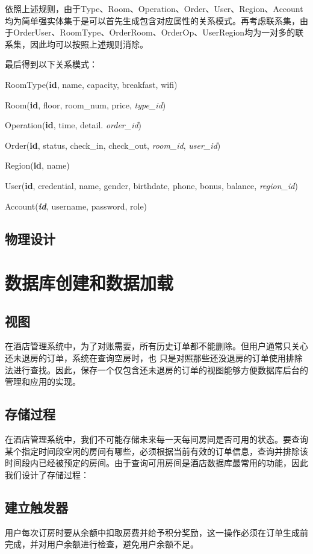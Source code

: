 \documentclass{myreport}
\begin{document}
依照上述规则，由于Type、Room、Operation、Order、User、Region、Account均为简单强实体集于是可以首先生成包含对应属性的关系模式。再考虑联系集，由于OrderUser、RoomType、OrderRoom、OrderOp、UserRegion均为一对多的联系集，因此均可以按照上述规则消除。

最后得到以下关系模式：

RoomType(\textbf{id}, name, capacity, breakfast, wifi)

Room(\textbf{id}, floor, room\_num, price, \textit{type\_id})

Operation(\textbf{id}, time, detail. \textit{order\_id})

Order(\textbf{id}, status, check\_in, check\_out, \textit{room\_id}, \textit{user\_id})

Region(\textbf{id}, name)

User(\textbf{id}, credential, name, gender, birthdate, phone, bonus, balance, \textit{region\_id})

Account(\textit{\textbf{id}}, username, password, role)


\section{物理设计}

\chapter{数据库创建和数据加载}
\section{视图}
在酒店管理系统中，为了对账需要，所有历史订单都不能删除。但用户通常只关心还未退房的订单，系统在查询空房时，也
只是对照那些还没退房的订单使用排除法进行查找。因此，保存一个仅包含还未退房的订单的视图能够方便数据库后台的管理和应用的实现。


\section{存储过程}
在酒店管理系统中，我们不可能存储未来每一天每间房间是否可用的状态。要查询某个指定时间段空闲的房间有哪些，必须根据当前有效的订单信息，查询并排除该时间段内已经被预定的房间。由于查询可用房间是酒店数据库最常用的功能，因此我们设计了存储过程：

\section{建立触发器}
用户每次订房时要从余额中扣取房费并给予积分奖励，这一操作必须在订单生成前完成，并对用户余额进行检查，避免用户余额不足。
\end{document}
